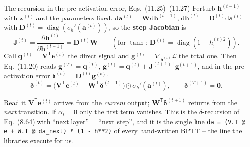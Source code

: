 \documentclass[10pt,aspectratio=169]{beamer}
\begin{document}
\begin{frame}{The recursion in the pre-activation error, Eqs.~(11.25)--(11.27)}
\small
Perturb $\bm{h}^{(t-1)}$ with $\bm{x}^{(t)}$ and the parameters fixed:
$\mathrm{d}\bm{a}^{(t)}=\bm{W}\mathrm{d}\bm{h}^{(t-1)}$,
$\mathrm{d}\bm{h}^{(t)}=\bm{D}^{(t)}\mathrm{d}\bm{a}^{(t)}$ with
$\bm{D}^{(t)}=\operatorname{diag}(\sigma_h'(\bm{a}^{(t)}))$, so the
\textbf{step Jacobian} is
\[
  \bm{J}^{(t)}=\frac{\partial\bm{h}^{(t)}}{\partial\bm{h}^{(t-1)}}=\bm{D}^{(t)}\bm{W}
  \qquad(\text{for }\tanh\text{: }\bm{D}^{(t)}=\operatorname{diag}(1-h^{(t)2}_i)).
\]
Call $\bm{q}^{(t)}=\bm{V}^{\mathsf{T}}\bm{e}^{(t)}$ the direct signal and
$\bm{g}^{(t)}=\nabla_{\bm{h}^{(t)}}\mathcal{L}$ the total one.  Then
Eq.~(11.20) reads $\bm{g}^{(T)}=\bm{q}^{(T)}$,
$\bm{g}^{(t)}=\bm{q}^{(t)}+\bm{J}^{(t+1)\mathsf{T}}\bm{g}^{(t+1)}$, and in the
pre-activation error $\bm{\delta}^{(t)}=\bm{D}^{(t)}\bm{g}^{(t)}$:
\[
  \boxed{\;\bm{\delta}^{(t)}
   =\bigl(\bm{V}^{\mathsf{T}}\bm{e}^{(t)}+\bm{W}^{\mathsf{T}}\bm{\delta}^{(t+1)}\bigr)
    \odot\sigma_h'(\bm{a}^{(t)}),\qquad \bm{\delta}^{(T+1)}=\bm{0}.\;}
\]
\begin{block}{Read it}
$\bm{V}^{\mathsf{T}}\bm{e}^{(t)}$ arrives from the \emph{current} output;
$\bm{W}^{\mathsf{T}}\bm{\delta}^{(t+1)}$ returns from the \emph{next}
transition.  If $\alpha_t=0$ only the first term vanishes.  This is the
$\delta$-recursion of Eq.~(8.64) with ``next layer'' = ``next step'', and
it is the single line \texttt{da = (V.T @ e + W.T @ da\_next) * (1 - h**2)}
of every hand-written BPTT -- the line the libraries execute for us.
\end{block}
\end{frame}
\end{document}
